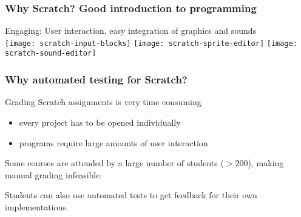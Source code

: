 \begin{frame}\frametitle{Why Scratch? Good introduction to programming}
    \centering
    Engaging: User interaction, easy integration of graphics and sounds\\[\medskipamount]
    \texttt{[image: scratch-input-blocks]}
    \texttt{[image: scratch-sprite-editor]}
    \texttt{[image: scratch-sound-editor]}
\end{frame}

\begin{frame}
\end{frame}

\begin{frame}\frametitle{Why automated testing for Scratch?}
    Grading Scratch assignments is very time consuming
    \begin{itemize}
        \item every project has to be opened individually
        \item programs require large amounts of user interaction
    \end{itemize}

    \bigskip

    Some courses are attended by a large number of students ($> 200$), making manual grading infeasible.

    \bigskip

    Students can also use automated tests to get feedback for their own implementations.
\end{frame}
